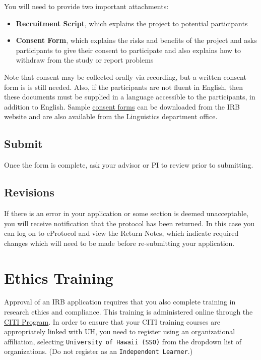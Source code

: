 \documentclass[
]{book}
\providecommand{\tightlist}{%
  \setlength{\itemsep}{0pt}\setlength{\parskip}{0pt}}
\begin{document}
You will need to provide two important attachments:

\begin{itemize}
\tightlist
\item
  \textbf{Recruitment Script}, which explains the project to potential participants
\item
  \textbf{Consent Form}, which explains the risks and benefits of the project and asks participants to give their consent to participate and also explains how to withdraw from the study or report problems
\end{itemize}

Note that consent may be collected orally via recording, but a written consent form is is still needed. Also, if the participants are not fluent in English, then these documents must be supplied in a language accessible to the participants, in addition to English. Sample \href{https://research.hawaii.edu/orc/human-studies/forms/\#templates}{consent forms} can be downloaded from the IRB website and are also available from the Linguistics department office.

\hypertarget{submit}{%
\subsection{Submit}\label{submit}}

Once the form is complete, ask your advisor or PI to review prior to submitting.

\hypertarget{revisions}{%
\subsection{Revisions}\label{revisions}}

If there is an error in your application or some section is deemed unacceptable, you will receive notification that the protocol has been returned. In this case you can log on to eProtocol and view the Return Notes, which indicate required changes which will need to be made before re-submitting your application.

\hypertarget{ethics-training}{%
\section{Ethics Training}\label{ethics-training}}

Approval of an IRB application requires that you also complete training in research ethics and compliance. This training is administered online through the \href{https://about.citiprogram.org}{CITI Program}. In order to ensure that your CITI training courses are appropriately linked with UH, you need to register using an organizational affiliation, selecting \texttt{University\ of\ Hawaii\ (SSO)} from the dropdown list of organizations. (Do not register as an \texttt{Independent\ Learner}.)
\end{document}
